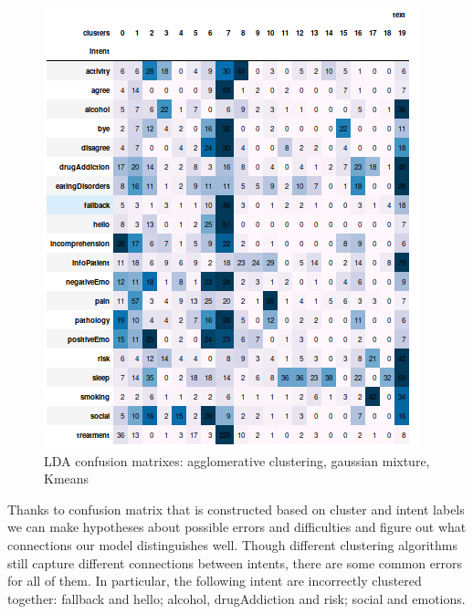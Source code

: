 \documentclass[11pt]{article}
\begin{document}
\begin{figure}[h]
	\includegraphics[scale=0.28]{lda_km_cm.png}
	\caption{LDA confusion matrixes: agglomerative clustering, gaussian mixture, Kmeans}
\label{lda_gm_cm}
\end{figure}
\FloatBarrier

Thanks to confusion matrix that is constructed based on cluster and
intent labels we can make hypotheses about possible errors and
difficulties and figure out what connections our model distinguishes
well. Though different clustering algorithms still capture different
connections between intents, there are some common errors for all of
them. In particular, the following intent are incorrectly clustered
together: fallback and hello; alcohol, drugAddiction and risk; social
and emotions.

\end{document}
